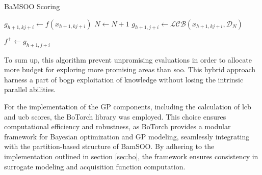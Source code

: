 \begin{algorithm}
\caption{BaMSOO Scoring}
\label{algo:bamsoo}
\begin{algorithmic}[1]
                 
                    \State $g_{h+1,kj+i} \gets f(x_{h+1,kj+i}) $ 
                    \State $N \gets N+1$ 
                \Else
                    \State $g_{h+1,j+i} \gets \mathcal{LCB}(x_{h+1,kj+i},\mathcal D_N) $ 
                \EndIf

                    \State $f^+ \gets g_{h+1,j+i} $ 
                \EndIf         
\end{algorithmic}
\end{algorithm}

To sum up, this algorithm prevent unpromising evaluations in order to allocate more budget for exploring more promising areas than \acrshort{soo}. This hybrid approach harness a part of \acrshort{bogp} exploitation of knowledge without losing the intrinsic parallel abilities.

For the implementation of the GP components, including the calculation of \acrshort{lcb} and \acrshort{ucb} scores, the BoTorch library was employed. This choice ensures computational efficiency and robustness, as BoTorch provides a modular framework for Bayesian optimization and GP modeling, seamlessly integrating with the partition-based structure of BamSOO. By adhering to the implementation outlined in section \ref{sec:bo}, the framework ensures consistency in surrogate modeling and acquisition function computation.

